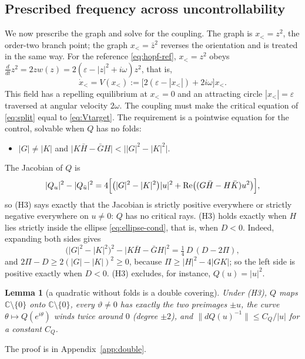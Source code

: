 \documentclass[11pt,reqno]{amsart}
\theoremstyle{plain}
\newtheorem*{lemma}{Lemma}
\theoremstyle{definition}
\theoremstyle{remark}
\newcommand{\C}{\mathbb{C}}
\begin{document}
\subsection{Prescribed frequency across uncontrollability}\label{sec:general-freq}
We now prescribe the graph and solve for the coupling. The graph is $x_<=z^{2}$, the order-two
branch point; the graph $x_<=\bar z^{2}$ reverses the orientation and is treated in the same way.
For the reference \eqref{eq:hopf-ref}, $x_<=z^{2}$ obeys
$\frac{d}{dt}z^{2}=2zw(z)=2(\varepsilon-|z|^{2}+i\omega)z^{2}$, that is,
\begin{equation}\label{eq:Vtarget}
  \dot x_<=V(x_<):=\bigl[2(\varepsilon-|x_<|)+2i\omega\bigr]x_< .
\end{equation}
This field has a repelling equilibrium at $x_<=0$ and an attracting circle $|x_<|=\varepsilon$
traversed at angular velocity $2\omega$. The coupling must make the critical equation of
\eqref{eq:split} equal to \eqref{eq:Vtarget}. The requirement is a pointwise equation for the
control, solvable when $Q$ has no folds:
\begin{itemize}
\item[(H3)] $|G|\neq|K|$ and $\bigl|K\bar H-\bar GH\bigr|<\bigl||G|^{2}-|K|^{2}\bigr|$.
\end{itemize}
The Jacobian of $Q$ is
\begin{equation}\label{eq:jacQ}
  |Q_u|^{2}-|Q_{\bar u}|^{2}=4\Bigl[\bigl(|G|^{2}-|K|^{2}\bigr)|u|^{2}
     +\mathrm{Re}\bigl((G\bar H-H\bar K)u^{2}\bigr)\Bigr],
\end{equation}
so (H3) says exactly that the Jacobian is strictly positive everywhere or strictly negative everywhere on
$u\neq0$: $Q$ has no critical rays. (H3) holds
exactly when $H$ lies strictly inside the ellipse \eqref{eq:ellipse-cond}, that is, when $D<0$. Indeed,
expanding both sides gives
\[
  \bigl(|G|^{2}-|K|^{2}\bigr)^{2}-\bigl|K\bar H-\bar GH\bigr|^{2}=\tfrac14\,D\,(D-2\Pi),
\]
and $2\Pi-D\ge2(|G|-|K|)^{2}\ge0$, because $\Pi\ge|H|^{2}-4|GK|$; so the left side is positive exactly when
$D<0$. (H3) excludes, for instance, $Q(u)=|u|^{2}$.

\begin{lemma}[a quadratic without folds is a double covering]\label{lem:double}
Under \textup{(H3)}, $Q$ maps $\C\setminus\{0\}$ onto $\C\setminus\{0\}$, every $\vartheta\neq0$ has exactly
the two preimages $\pm u$, the curve $\theta\mapsto Q(e^{i\theta})$ winds twice around $0$ (degree $\pm2$), and
$\|dQ(u)^{-1}\|\le C_Q/|u|$ for a constant $C_Q$.
\end{lemma}
The proof is in Appendix~\ref{app:double}.
\end{document}
